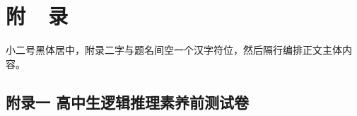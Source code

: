 \renewcommand\theequation{A.\arabic{equation}}
\renewcommand\thefigure{A.\arabic{figure}}
\renewcommand\thetable{A.\arabic{table}}
\setcounter{equation}{0} 
\setcounter{figure}{0}
\setcounter{table}{0}

\chapter*{附\ \ 录}\label{Appendix}
\vspace{0.68cm}


小二号黑体居中，附录二字与题名间空一个汉字符位，然后隔行编排正文主体内容。 

\section*{附录一 \quad 高中生逻辑推理素养前测试卷}\label{fulu2}
\renewcommand\theequation{1.\arabic{equation}}
\renewcommand\thefigure{1.-\arabic{figure}}
\renewcommand\thetable{1.\arabic{table}}
\setcounter{equation}{0}
\setcounter{figure}{0}
\setcounter{table}{0}

